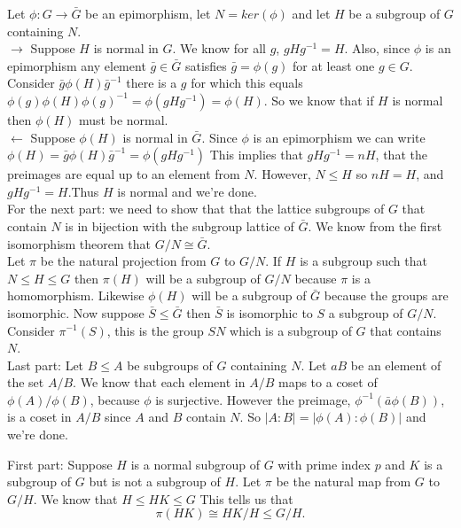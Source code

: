 \documentclass[12pt]{report}
\begin{document}
 Let $\phi : G \to \bar{G}$ be an epimorphism, let $N =
ker(\phi)$ and let $H$ be a subgroup of $G$ containing $N$.\\

$\rightarrow$ Suppose $H$ is normal in $G$. We know for all $g$, $gHg^{-1} = H$.
Also, since $\phi$ is an epimorphism any element $\bar{g} \in \bar{G}$ satisfies
$\bar{g} = \phi(g)$ for at least one $g \in G$. Consider $\bar{g}\phi(H)\bar{g}
^{-1}$ there is a $g$ for which this equals $\phi(g)\phi(H)\phi(g)^{-1} =
\phi(gHg^{-1}) = \phi(H)$. So we know that if $H$ is normal then $\phi(H)$ must
be normal.\\

$\leftarrow$ Suppose $\phi(H)$ is normal in $\bar{G}$. Since $\phi$ is an
epimorphism we can write $\phi(H) = \bar{g}\phi(H)\bar{g}^{-1} = \phi(gHg^{-1})$
This implies that $gHg^{-1} = nH$, that the preimages are equal up to an element
from $N$. However, $N \leq H$ so $nH = H$, and $gHg^{-1} = H$.Thus $H$ is normal
and we're done.\\

For the next part: we need to show that that the lattice subgroups of $G$ that
contain $N$ is in bijection with the subgroup lattice of $\bar{G}$. We know from
the first isomorphism theorem that $G/N \cong \bar{G}$.\\

Let $\pi$ be the natural projection from $G$ to $G/N$. If $H$ is a subgroup such
that $N \leq H \leq G$ then $\pi(H)$ will be a subgroup of $G/N$ because $\pi$
is a homomorphism. Likewise $\phi(H)$ will be a subgroup of $\bar{G}$ because
the groups are isomorphic. Now suppose $\bar{S} \leq \bar{G}$ then $\bar{S}$ is
isomorphic to $S$ a subgroup of $G/N$. Consider $\pi^{-1}(S)$, this is the group
$SN$ which is a subgroup of $G$ that contains $N$.\\

Last part: Let $B \leq A$ be subgroups of $G$ containing $N$. Let $aB$ be an
element of the set $A/B$. We know that each element in $A/B$ maps to a coset of
$\phi(A)/\phi(B)$, because $\phi$ is surjective. However the preimage, $\phi^
{-1}(\bar{a}\phi(B))$, is a coset in $A/B$ since $A$ and $B$ contain $N$. So
$|A:B| = |\phi(A):\phi(B)|$ and we're done.\\


First part: Suppose $H$ is a normal subgroup of $G$ with prime index $p$ and $K$
is a subgroup of $G$ but is not a subgroup of $H$. Let $\pi$ be the natural map
from $G$ to $G/H$. We know that $H \leq HK \leq G$ This tells us that
$$\pi(HK) \cong HK/H \leq G/H.$$\\
\end{document}

